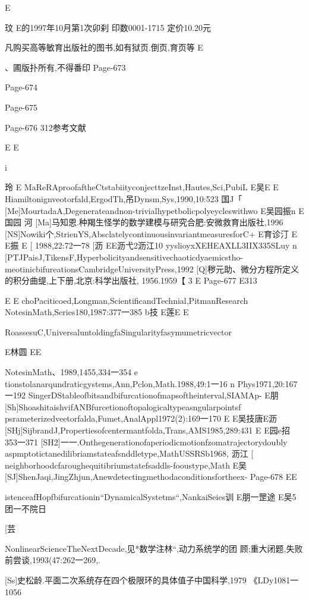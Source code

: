 E

玟
E的1997年10月第1次卯刹
印数0001-1715
定价10.20元

凡购买高等敏育出版社的图书,如有狱页.倒页,育页等
E

、圃版扑所有,不得番印
Page-673

Page-674

Page-675

Page-676
312参考文献

E
E

i

玲
E
MaReRAproofaftheCtstabiityconjecttzeInst,Hautes,Sci,PubiL
E吴E
E
Hiamiltonignveotorfald,ErgodTh,吊Dynsm,Sys,1990,10:523
国J「
[Me]MourtadaA,Degenerateandnon-trivialhypetbolicpolyeycleswithwo
E吴园振n
E国园
河
[Ma]马知恩.种羯生怪学的数学建模与研究合肥:安微救育出版社,1996
[NS]Nowiki个,StrienYS,AbsclatelycontinuousinvariantmeasuresforC+
E育诊汀
E
E振
E
[
1988,22:72一78
[沥
EE沥弋2沥江10
yyslioyxXEHEAXLL3IIX335SLuy
n
[PTJPaisJ,TikensF,Hyperbolicityandsensitivechaoticdyaemicstho-
meotinicbifureationsCambridgeUniversityPress,1992
[Q]秽元助、微分方程所定义的积分曲缇,上下册,北京:科学出版社,
1956.1959【
3
E
Page-677
E313

E
E
choPaciticoed,Longman,ScientificandTechnial,PitmanResearch
NotesinMath,Series180,1987:377一385
b技
E莲E
E

RoassesuC,UniversaluntoldingfaSingularityfasymumetricvector

E林圆
EE

NotesinMath、1989,1455,334一354
e
tionstolanarqundraticgystems,Ann,Pclon,Math.1988,49:1一16
n
Phys1971,20:167一192
SingerDStableofbitsandbifurcationofmapsoftheinterval,SIAMAp-
E朋
[Sh]ShoashitaishvifANBfurcetionoftopalogicaltypeasngularpointsf
psrameterizedveetorfalda,Fumet,AnalAppl1972(2):169一170
E
E吴技唐E沥
[SHj]SijbrandJ,Propertiesofcentermantfolda,Trans,AMS1985,289:431
E
E园e招
353一371
[SH2]一一.Onthegenerationofaperiodicmotionfzomatrajectorydoubly
aspmptotictanedilibriamstateafsnddletype,MathUSSRSb1968,
沥江
[
neighborhoodcfaroughequitibriumstatefsaddls-fooustype,Math
E吴
[SJ]ShenJaqi,JingZhjun,Anewdetectingmethodaconditionsfortheex-
Page-678
EE

istenceafHopfbifurcationin“DynamicalSystetms“,NankaiSeies训
E朋一罡途
E吴5团一不院日

[芸

NonlinearScienceTheNextDecade,见*数学注林“,动力系统学的团
顾;重大闭题,失败前尝谈,1993(47:262一269,.

[Ss]史松龄.平面二次系统存在四个极限环的具体值子中国科学,1979
《LDy1081一1056

